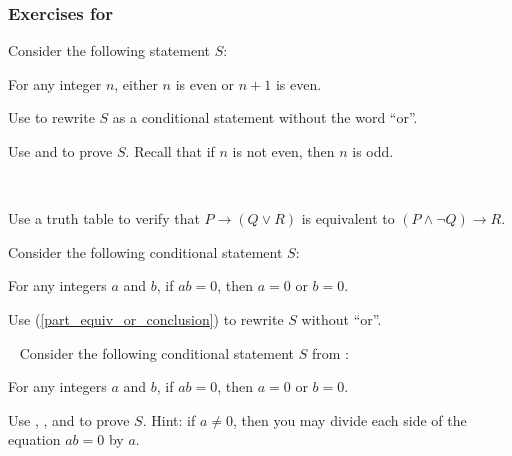 
\subsubsection*{Exercises for  \subpfforimplication}

\begin{exer}[\exerP] %
\label{exer_integer_or_next_is_even}
    Consider the following statement $S$:
        \begin{center}
            For any integer $n$, either $n$ is even or $n+1$ is even.
        \end{center}
        \begin{exerpart}
            \item Use  to rewrite $S$ as a conditional statement without the word ``or''.
            \item Use  and  to prove $S$. Recall that if $n$ is not even, then $n$ is odd.
        \end{exerpart}
\end{exer}

\begin{exer}[\exerU] %
\label{exer_no_zd_integers}
~
    \begin{exerpart}
        \item \label{part_equiv_or_conclusion} Use a truth table to verify that $P \to (Q \lor R)$ is equivalent to $(P \land \neg Q) \to R$.
        \item \label{part_zd_without_or} Consider the following conditional statement $S$:
            \begin{center}
                For any integers $a$ and $b$, if $ab=0$, then $a=0$ or $b=0$.
            \end{center}
        Use (\ref{part_equiv_or_conclusion}) to rewrite $S$ without ``or''. 
    \end{exerpart}
\end{exer}

\begin{exer}[\exerU] %
\label{exer_proof_no_zd_integers}
~
    Consider the following conditional statement $S$ from :
            \begin{center}
                For any integers $a$ and $b$, if $ab=0$, then $a=0$ or $b=0$.
            \end{center}
    Use , , and  to prove $S$. Hint: if $a \neq 0$, then you may divide each side of the equation $ab=0$ by $a$. 
\end{exer}

